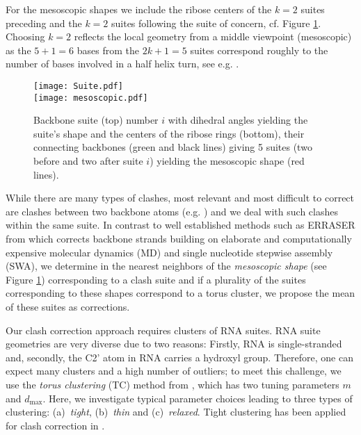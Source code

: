 \documentclass{llncs}
\begin{document}
For the mesoscopic shapes we include the ribose centers of the $k=2$ suites preceding and the $k = 2$ suites following the suite of concern, cf. Figure \ref{fig:suite-mesoscopic}. Choosing $k=2$ reflects the local geometry from a middle viewpoint (mesoscopic) as the $5+1 = 6$ bases from the $2k+1 = 5$ suites correspond roughly to the number of bases involved in a half helix turn, see e.g. \cite{watson2004molecular}.

\begin{figure}[ht!]
  \centering
  \texttt{[image: Suite.pdf]}\\
  \vspace*{\baselineskip}
  \texttt{[image: mesoscopic.pdf]}
 \caption{Backbone suite (top) number $i$ with dihedral angles yielding the suite's shape and the centers of the ribose rings (bottom), their connecting backbones (green and black lines) giving 5 suites (two before and two after suite $i$) yielding the mesoscopic shape (red lines). \label{fig:suite-mesoscopic}}
\end{figure}


While there are many types of clashes, most relevant and most difficult to correct are clashes between two backbone atoms (e.g. \cite{Murray13904}) and we deal with such clashes within the same suite.
In contrast to well established methods such as ERRASER from \cite{PMID:23202432} which corrects backbone strands building on elaborate and computationally expensive molecular dynamics (MD) and single nucleotide stepwise assembly (SWA), we determine in \cite{wiechers2021RNA} the nearest neighbors of the \emph{mesoscopic shape} (see Figure \ref{fig:suite-mesoscopic}) corresponding to a clash suite and if a plurality of the suites corresponding to these shapes correspond to a torus cluster, we propose the mean of these suites as corrections. %

Our clash correction approach requires clusters of RNA suites.
RNA suite geometries are very diverse due to two reasons: Firstly, RNA is single-stranded and, secondly, the C2' atom in RNA carries a hydroxyl group. %
Therefore, one can expect many clusters and a high number of outliers; to meet this challenge, we use the \emph{torus clustering} (TC) method from \cite{eltzner2015torus}, which has two tuning parameters $m$ and $d_{\text{max}}$. Here, we investigate typical parameter choices leading to three types of clustering: (a)~\emph{tight}, (b)~\emph{thin} and (c)~\emph{relaxed}.
Tight clustering has been applied for clash correction in \cite{wiechers2021RNA}.
\end{document}
